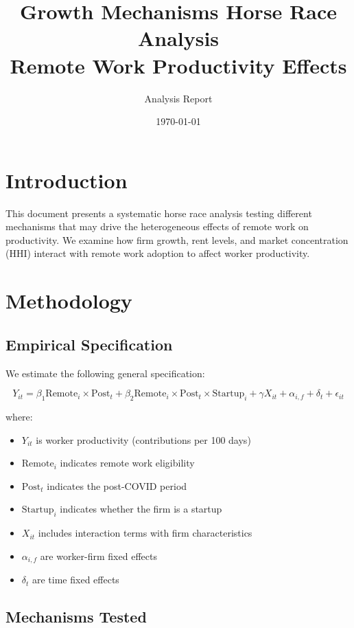 \documentclass[11pt]{article}
\title{Growth Mechanisms Horse Race Analysis\\
\large Remote Work Productivity Effects}
\author{Analysis Report}
\date{\today}
\begin{document}
\maketitle

\section{Introduction}

This document presents a systematic horse race analysis testing different mechanisms that may drive the heterogeneous effects of remote work on productivity. We examine how firm growth, rent levels, and market concentration (HHI) interact with remote work adoption to affect worker productivity.

\section{Methodology}

\subsection{Empirical Specification}

We estimate the following general specification:

\begin{equation}
Y_{it} = \beta_1 \text{Remote}_i \times \text{Post}_t + \beta_2 \text{Remote}_i \times \text{Post}_t \times \text{Startup}_i + \gamma X_{it} + \alpha_{i,f} + \delta_t + \epsilon_{it}
\end{equation}

where:
\begin{itemize}
\item $Y_{it}$ is worker productivity (contributions per 100 days)
\item $\text{Remote}_i$ indicates remote work eligibility
\item $\text{Post}_t$ indicates the post-COVID period
\item $\text{Startup}_i$ indicates whether the firm is a startup
\item $X_{it}$ includes interaction terms with firm characteristics
\item $\alpha_{i,f}$ are worker-firm fixed effects
\item $\delta_t$ are time fixed effects
\end{itemize}

\subsection{Mechanisms Tested}
\end{document}
